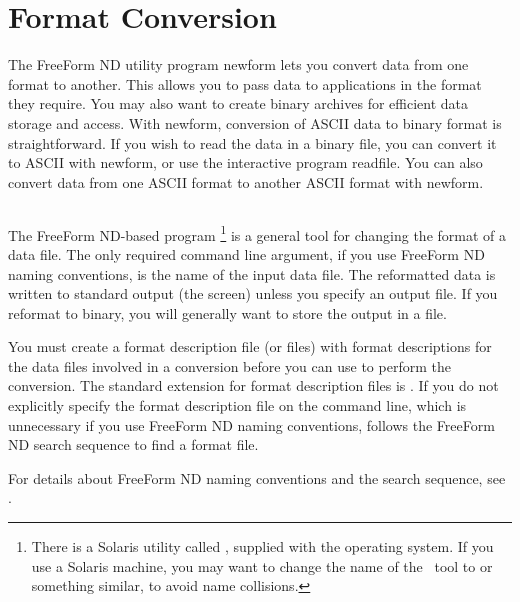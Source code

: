 %
%

\chapter{Format Conversion}
\label{ff,fmtconv}

The FreeForm ND utility program newform lets you convert data from one
format to another. This allows you to pass data to applications in the
format they require. You may also want to create binary archives for
efficient data storage and access. With newform, conversion of ASCII
data to binary format is straightforward. If you wish to read the data
in a binary file, you can convert it to ASCII with newform, or use the
interactive program readfile. You can also convert data from one ASCII
format to another ASCII format with newform.

\section{}
\label{ff,newform}

The FreeForm ND-based program \footnote{There is a
  Solaris utility called , supplied with the operating
  system.  If you use a Solaris machine, you may want to change the
  name of the \ffnd\ tool to  or something similar, to
  avoid name collisions.} is a general tool for changing the format of
a data file. The only required command line argument, if you use
FreeForm ND naming conventions, is the name of the input data file.
The reformatted data is written to standard output (the screen) unless
you specify an output file. If you reformat to binary, you will
generally want to store the output in a file.

You must create a format description file (or files) with format
descriptions for the data files involved in a conversion before you
can use  to perform the conversion. The standard
extension for format description files is . If you do not
explicitly specify the format description file on the command line,
which is unnecessary if you use FreeForm ND naming conventions,
 follows the FreeForm ND search sequence to find a format
file.

For details about FreeForm ND naming conventions and the search
sequence, see .

